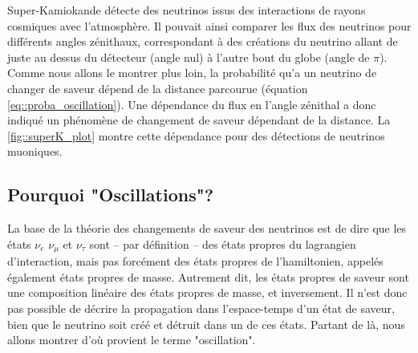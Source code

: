             Super-Kamiokande détecte des neutrinos issus des interactions de rayons cosmiques avec l'atmosphère. Il pouvait ainsi comparer les flux des neutrinos pour différents angles zénithaux, correspondant à des créations du neutrino allant de juste au dessus du détecteur (angle nul) à l'autre bout du globe (angle de $\pi$). Comme nous allons le montrer plus loin, la probabilité qu'a un neutrino de changer de saveur dépend de la distance parcourue (équation \eqref{eq::proba_oscillation}). Une dépendance du flux en l'angle zénithal a donc indiqué un phénomène de changement de saveur dépendant de la distance. La \autoref{fig::superK_plot} montre cette dépendance pour des détections de neutrinos muoniques.
    
        \subsection{Pourquoi "Oscillations"?}\label{sec::oscillations}
            La base de la théorie des changements de saveur des neutrinos est de dire que les états $\nu_e$ $\nu_{\mu}$ et $\nu_{\tau}$ sont -- par définition -- des états propres du lagrangien d'interaction, mais pas forcément des états propres de l'hamiltonien, appelés également états propres de masse. Autrement dit, les états propres de saveur sont une composition linéaire des états propres de masse, et inversement. Il n'est donc pas possible de décrire la propagation dans l'espace-temps d'un état de saveur, bien que le neutrino soit créé et détruit dans un de ces états. Partant de là, nous allons montrer d'où provient le terme "oscillation".
            
